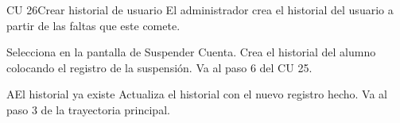\begin{UseCase} {CU 26}{Crear historial de usuario}{
	El administrador crea el historial del usuario a partir de las faltas que este comete.
}




\end{UseCase}


\begin{UCtrayectoria}	
	\UCpaso [\UCactor]	Selecciona  en la pantalla de Suspender Cuenta. 
	\UCpaso [\UCsist]Crea el historial del alumno colocando el registro de la suspensión.
	\UCpaso Va al paso 6 del CU 25.
\end{UCtrayectoria}



\begin{UCtrayectoriaA}{A}{El historial ya existe}
	\UCpaso [\UCsist]Actualiza el historial con el nuevo registro hecho.
	\UCpaso Va al paso 3 de la trayectoria principal.
\end{UCtrayectoriaA}

